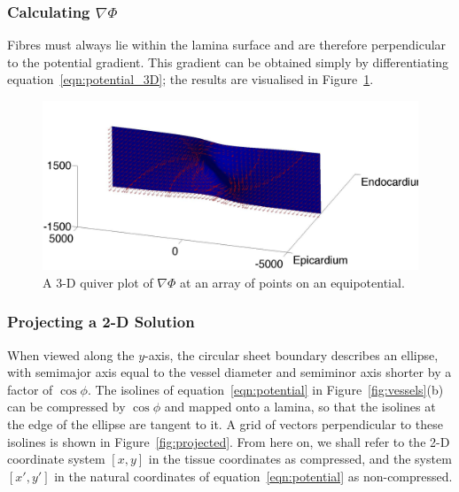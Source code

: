   \subsubsection{Calculating $\nabla\Phi$}
  \label{sub:calculating_nablaphi}
    Fibres must always lie within the lamina surface and are therefore perpendicular to the potential gradient. This gradient can be obtained simply by differentiating equation~\ref{eqn:potential_3D}; the results are visualised in Figure~\ref{fig:del_phi}.
    
    \begin{figure}[htbp]
      \centering
      \includegraphics[width=1\textwidth]{Ch5/Figs/del_phi}
      \caption{A 3-D quiver plot of $\nabla\Phi$ at an array of points on an equipotential.}
      \label{fig:del_phi}
    \end{figure}
  
  \subsubsection{Projecting a 2-D Solution} %
  \label{sub:projecting_a_2_d_solution}
    When viewed along the $y$-axis, the circular sheet boundary describes an ellipse, with semimajor axis equal to the vessel diameter and semiminor axis shorter by a factor of $\cos \phi$. The isolines of equation~\ref{eqn:potential} in Figure~\ref{fig:vessels}(b) can be compressed by $\cos \phi$ and mapped onto a lamina, so that the isolines at the edge of the ellipse are tangent to it. A grid of vectors perpendicular to these isolines is shown in Figure~\ref{fig:projected}. From here on, we shall refer to the 2-D coordinate system $\left[ x, y \right]$ in the tissue coordinates as compressed, and the system $\left[ x', y' \right]$ in the natural coordinates of equation~\ref{eqn:potential} as non-compressed.
    
